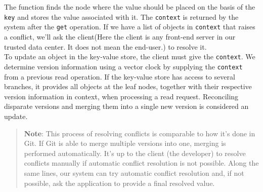 \begin{table}[htbp]
\centering
\small
{}
\end{table}
\\
\\
The function finds the node where the value should be placed on the basis of the \texttt{key} and stores the value associated with it. The
\texttt{context} is returned by the system after the \texttt{get} operation. If we have a list of objects in \texttt{context} that raises a conflict, we'll ask the client(Here the client is any front-end server in our trusted data center. It does not mean the end-user.) to resolve it.
\\
To update an object in the key-value store, the client must give the \texttt{context}. We determine version information using a vector clock by supplying the \texttt{context} from a previous read operation. If the key-value store has access to several branches, it provides all objects at the leaf nodes, together with their respective version information in context, when processing a read request. Reconciling disparate versions and merging them into a single new version is considered an update.
\begin{quote}
\textbf{Note}: This process of resolving conflicts is comparable to how it's done in Git. If Git is able to merge multiple versions into one, merging is performed automatically. It's up to the client (the developer) to resolve conflicts manually if automatic conflict resolution is not possible. Along the same lines, our system can try automatic conflict resolution and, if not possible, ask the application to provide a final resolved value.
\end{quote}
